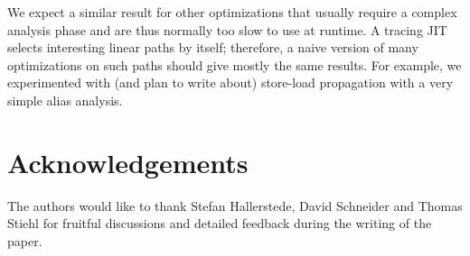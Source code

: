 \documentclass[preprint]{sigplanconf}
\begin{document}
We expect a similar result for other optimizations that usually require
a complex analysis phase and are thus normally too slow to use at
runtime.  A tracing JIT selects interesting linear paths by itself;
therefore, a naive version of many optimizations on such paths should
give mostly the same results.  For example, we experimented with (and
plan to write about) store-load propagation with a very simple alias
analysis.


\section*{Acknowledgements}

The authors would like to thank Stefan Hallerstede, David Schneider and Thomas
Stiehl for fruitful discussions and detailed feedback during the writing of the
paper.



\end{document}
